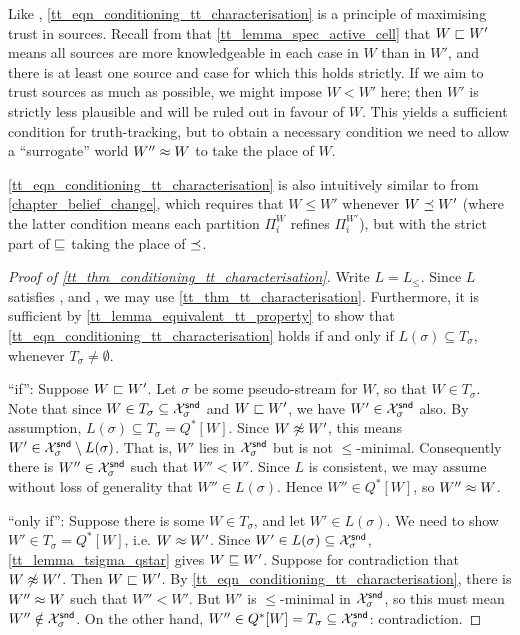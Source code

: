 Like \credulity{}, \cref{tt_eqn_conditioning_tt_characterisation} is a principle of
maximising trust in sources. Recall from that \cref{tt_lemma_spec_active_cell}
that $W \sqsubset W'$ means all sources are more knowledgeable in each case in
$W$ than in $W'$, and there is at least one source and case for which this
holds strictly. If we aim to trust sources as much as possible, we might impose
$W < W'$ here; then $W'$ is strictly less plausible and will be ruled out in
favour of $W$.  This yields a sufficient condition for truth-tracking, but to
obtain a necessary condition we need to allow a ``surrogate'' world $W'' \approx
W$ to take the place of $W$.

\cref{tt_eqn_conditioning_tt_characterisation} is also intuitively similar to
 from \cref{chapter_belief_change}, which requires that $W \le W'$
whenever $W \preceq W'$ (where the latter condition means each partition
$\Pi^W_i$ refines $\Pi^{W'}_i$), but with the strict part of $\sqsubseteq$ taking
the place of $\preceq$.

\begin{proof}[Proof of \cref{tt_thm_conditioning_tt_characterisation}]
    Write $L = L_{\le}$. Since $L$ satisfies \equivalence{}, \repetition{} and
    \soundness{}, we may use \cref{tt_thm_tt_characterisation}. Furthermore, it is
    sufficient by \cref{tt_lemma_equivalent_tt_property} to show that
    \cref{tt_eqn_conditioning_tt_characterisation} holds if and only if $L(\sigma)
    \subseteq T_\sigma$, whenever $T_\sigma \ne \emptyset$.

    ``if'': Suppose $W \sqsubset W'$. Let $\sigma$ be some pseudo-stream for $W$,
    so that $W \in T_\sigma$.\footnotemark{} Note that since $W \in T_\sigma
    \subseteq \mathcal{X}^{\mathsf{snd}}_\sigma$ and $W \sqsubset W'$, we have $W' \in \mathcal{X}^{\mathsf{snd}}_\sigma$
    also. By assumption, $L(\sigma) \subseteq T_\sigma = Q^*[W]$. Since $W
    \not\approx W'$, this means $W' \in \mathcal{X}^{\mathsf{snd}}_\sigma \setminus L(\sigma)$. That
    is, $W'$ lies in $\mathcal{X}^{\mathsf{snd}}_\sigma$ but is not $\le$-minimal. Consequently
    there is $W'' \in \mathcal{X}^{\mathsf{snd}}_\sigma$ such that $W'' < W'$. Since $L$ is
    consistent, we may assume without loss of generality that $W'' \in
    L(\sigma)$. Hence $W'' \in Q^*[W]$, so $W'' \approx W$.


    ``only if'': Suppose there is some $W \in T_\sigma$, and let $W' \in
    L(\sigma)$. We need to show $W' \in T_\sigma = Q^*[W]$, i.e. $W \approx
    W'$. Since $W' \in L(\sigma) \subseteq \mathcal{X}^{\mathsf{snd}}_\sigma$,
    \cref{tt_lemma_tsigma_qstar} gives $W \sqsubseteq W'$. Suppose for contradiction
    that $W \not\approx W'$. Then $W \sqsubset W'$. By
    \cref{tt_eqn_conditioning_tt_characterisation}, there is $W'' \approx W$ such
    that $W'' < W'$. But $W'$ is $\le$-minimal in $\mathcal{X}^{\mathsf{snd}}_\sigma$, so this must
    mean $W'' \notin \mathcal{X}^{\mathsf{snd}}_\sigma$. On the other hand, $W'' \in Q^*[W] =
    T_\sigma \subseteq \mathcal{X}^{\mathsf{snd}}_\sigma$: contradiction.
\end{proof}

